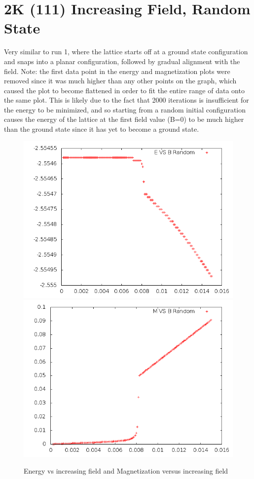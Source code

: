 \documentclass{article}
\begin{document}
\section{2K (111) Increasing Field, Random State}
Very similar to run 1, where the lattice starts off at a ground state configuration and snaps into
a planar configuration, followed by gradual alignment with the field. Note: the first data point
in the energy and magnetization plots were removed since it was much higher than any other points
on the graph, which caused the plot to become flattened in order to fit the entire range of data onto
the same plot. This is likely due to the fact that 2000 iterations is insufficient for the energy to
be minimized, and so starting from a random initial configuration causes the energy of the lattice at
the first field value (B=0) to be much higher than the ground state since it has yet to become a 
ground state. 
\begin{figure}[h]
 \centering 
\includegraphics[scale=0.3]{111_2000/E000to005R.png}
\includegraphics[scale=0.3]{111_2000/M000to005R.png}
\caption{Energy vs increasing field and Magnetization versus increasing field}
\end{figure}
\end{document}
